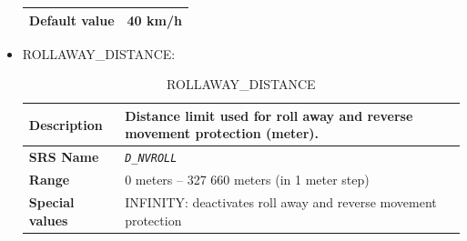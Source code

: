 \documentclass{template/openetcs}
\begin{document}
\begin{itemize}
\begin{longtable}{|l|l|}
				\hline
										
					\begin{minipage}[t]{0.22\linewidth} \textbf{Default value}	\end{minipage} 
				&	\begin{minipage}[t]{0.78\linewidth} 40 km/h \end{minipage} \\
				
				\hline
				
			\end{longtable}						
			
		\item ROLLAWAY\_DISTANCE:
		
			\begin{longtable}{|l|l|}
				\caption{ROLLAWAY\_DISTANCE}\\ 														
				\hline
				
					\begin{minipage}[t]{0.22\linewidth} \textbf{Description}	\end{minipage} 
				&	\begin{minipage}[t]{0.78\linewidth} Distance limit used for roll away and reverse movement protection (meter). \end{minipage} \\
				
				\hline
				
					\begin{minipage}[t]{0.22\linewidth} \textbf{SRS Name}	\end{minipage} 
				&	\begin{minipage}[t]{0.78\linewidth} \emph{\texttt{D\_NVROLL}} \end{minipage} \\
				
				\hline
														
					\begin{minipage}[t]{0.22\linewidth} \textbf{Range}	\end{minipage} 
				&	\begin{minipage}[t]{0.78\linewidth} 0 meters – 327 660 meters (in 1 meter step) \end{minipage} \\
				
				\hline
																		
					\begin{minipage}[t]{0.22\linewidth} \textbf{Special values}	\end{minipage} 
				&	\begin{minipage}[t]{0.78\linewidth} INFINITY: deactivates roll away and reverse movement protection \end{minipage} \\
								

\end{longtable}
\end{itemize}
\end{document}
